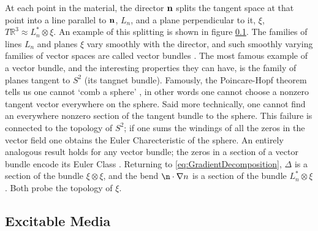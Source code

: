 At each point in the material, the director $\bf n$ splits the tangent space at that point into a line parallel to $\bf n$, $L_n$, and a plane perpendicular to it, $\xi$, $T \mathbb{R}^3 \approx L_n^* \otimes \xi$. An example of this splitting is shown in figure \ref{}. The families of lines $L_n$ and planes $\xi$ vary smoothly with the director, and such smoothly varying families of vector spaces are called vector bundles \cite{}. The most famous example of a vector bundle, and the interesting properties they can have, is the family of planes tangent to $S^2$ (its tangnet bundle). Famously, the Poincare-Hopf theorem tells us one cannot `comb a sphere' \cite{}, in other words one cannot choose a nonzero tangent vector everywhere on the sphere. Said more technically, one cannot find an everywhere nonzero section of the tangent bundle to the sphere. This failure is connected to the topology of $S^2$; if one sums the windings of all the zeros in the vector field one obtains the Euler Charecteristic of the sphere. An entirely analogous result holds for any vector bundle; the zeros in a section of a vector bundle encode its Euler Class \cite{}. Returning to \ref{eq:GradientDecomposition}, $\Delta$ is a section of the bundle $\xi \otimes \xi$, and the bend $\n \cdot \nabla n$ is a section of the bundle $L_n^* \otimes \xi$. Both probe the topology of $\xi$.


\subsection{Excitable Media}



